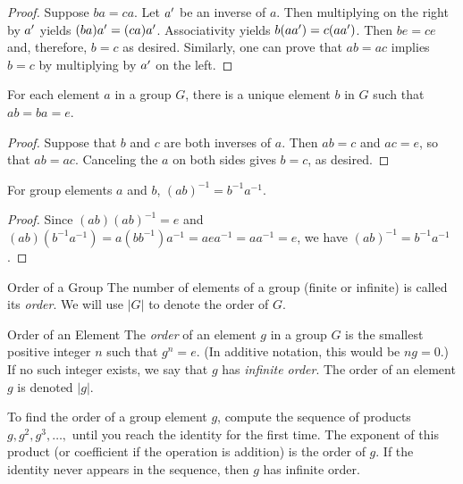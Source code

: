 \documentclass[../butidigress.tex]{subfiles}
\begin{document}
\begin{proof}
Suppose $ba = ca$.
Let ${a}^{\prime}$ be an inverse of $a$.
Then multiplying on the right by ${a}^{\prime}$ yields $(ba){a}^{\prime} = (ca){a}^{\prime}$.
Associativity yields $b(a{a}^{\prime}) = c(a{a}^{\prime})$.
Then $be = ce$ and, therefore, $b = c$ as desired.
Similarly, one can prove that $ab = ac$ implies $b = c$ by multiplying by ${a}^{\prime}$ on the left.
\end{proof}

\begin{theorem}
For each element $a$ in a group $G$, there is a unique element $b$ in $G$ such that $ab=ba=e$.
\end{theorem}

\begin{proof}
Suppose that $b$ and $c$ are both inverses of $a$.
Then $ab = c$ and $ac = e$, so that $ab = ac$.
Canceling the $a$ on both sides gives $b = c$, as desired.
\end{proof}

\begin{theorem}
For group elements $a$ and $b$, $(ab)^{-1} = b^{-1}a^{-1}$.
\end{theorem}

\begin{proof}
Since $(ab)(ab)^{-1} = e$ and $(ab)(b^{-1}a^{-1}) = a(bb^{-1})a^{-1} = aea^{-1} = aa^{-1} = e$, we have $(ab)^{-1} = b^{-1}a^{-1}$.
\end{proof}


\begin{definition}{Order of a Group}
The number of elements of a group (finite or infinite) is called its \emph{order}.
We will use $|G|$ to denote the order of $G$.
\end{definition}

\begin{definition}{Order of an Element}
The \emph{order} of an element $g$ in a group $G$ is the smallest positive integer $n$ such that $g^{n} = e$.
(In additive notation, this would be $ng = 0$.)
If no such integer exists, we say that $g$ has \emph{infinite order}.
The order of an element $g$ is denoted $|g|$.
\end{definition}

To find the order of a group element $g$, compute the sequence of products $g, g^{2}, g^{3},\ldots,$ until you reach the identity for the first time.
The exponent of this product (or coefficient if the operation is addition) is the order of $g$.
If the identity never appears in the sequence, then $g$ has infinite order.
\end{document}

